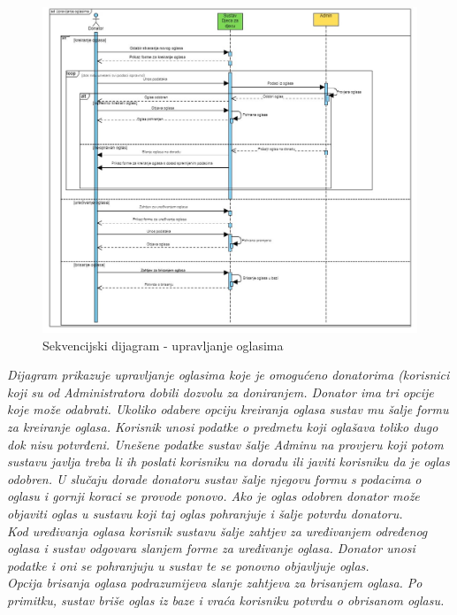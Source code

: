 				\begin{figure}[H]
						\includegraphics[width=\textwidth,height=0.7\textheight]{dijagrami/sqd_upr_ogl.png}
						\centering
						\caption{Sekvencijski dijagram - upravljanje oglasima}
						\label{fig:Upravljanje oglasima}
				\end{figure}
				\textit{Dijagram prikazuje upravljanje oglasima koje je omogućeno donatorima (korisnici koji su od Administratora dobili dozvolu za doniranjem. Donator ima tri opcije koje može odabrati. Ukoliko odabere opciju kreiranja oglasa sustav mu šalje formu za kreiranje oglasa. Korisnik unosi podatke o predmetu koji oglašava toliko dugo dok nisu potvrđeni. Unešene podatke sustav šalje Adminu na provjeru koji potom sustavu javlja treba li ih poslati korisniku na doradu ili javiti korisniku da je oglas odobren. U slučaju dorade donatoru sustav šalje njegovu formu s podacima o oglasu i gornji koraci se provode ponovo. Ako je oglas odobren donator može objaviti oglas u sustavu koji taj oglas pohranjuje i šalje potvrdu donatoru. \\Kod uređivanja oglasa korisnik sustavu šalje zahtjev za uređivanjem određenog oglasa i sustav odgovara slanjem forme za uređivanje oglasa. Donator unosi podatke i oni se pohranjuju u sustav te se ponovno objavljuje oglas. \\Opcija brisanja oglasa podrazumijeva slanje zahtjeva za brisanjem oglasa. Po primitku, sustav briše oglas iz baze i vraća korisniku potvrdu o obrisanom oglasu. }

